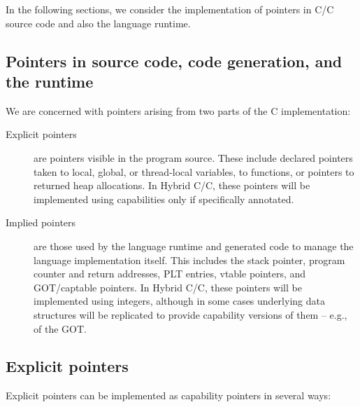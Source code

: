\documentclass[12pt,twoside,openright,a4paper]{article}
\newcommand*{\cpp}{\texorpdfstring{C\textsmaller[2]{\protect\nolinebreak[4]\hspace{-.05em}\raisebox{.45ex}{\textbf{++}}}}{C++}}
\newcommand*{\COrCpp}{C/\cpp{}}
\newcommand*{\hybridCOrCpp}{Hybrid \COrCpp{}}
\begin{document}
In the following sections, we consider the implementation of pointers in
C/\cpp{} source code and also the language runtime.

\subsection{Pointers in source code, code generation, and the runtime}

We are concerned with pointers arising from two parts of the C implementation:

\begin{description}
\item[Explicit pointers] are pointers visible in the program source.
  These include declared pointers taken to local, global, or thread-local
  variables, to functions, or pointers to returned heap allocations.
  In \hybridCOrCpp{}, these pointers will be implemented using capabilities
  only if specifically annotated.

\item[Implied pointers] are those used by the language runtime and generated
  code to manage the language implementation itself.
  This includes the stack pointer, program counter and return addresses, PLT
  entries, vtable pointers, and GOT/captable pointers.
  In \hybridCOrCpp{}, these pointers will be implemented using integers,
  although in some cases underlying data structures will be replicated to
  provide capability versions of them -- e.g., of the GOT.
\end{description}

\subsection{Explicit pointers}

Explicit pointers can be implemented as capability pointers in several ways:
\end{document}
